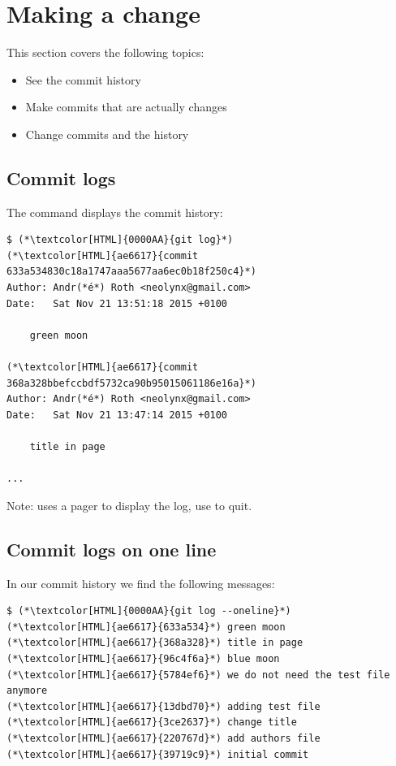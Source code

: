 \section{Making a change}
\begin{frame}[fragile]
  \slidetitle

  This section covers the following topics:
  \begin{itemize}
    \pause
    \item See the commit history
    \pause
    \item Make commits that are actually changes
    \pause
    \item Change commits and the history
  \end{itemize}
\end{frame}

\subsection{Commit logs}
\begin{frame}[fragile]
  \subslidetitle

  The command  displays the commit history:
  \begin{lstlisting}
$ (*\textcolor[HTML]{0000AA}{git log}*)
(*\textcolor[HTML]{ae6617}{commit 633a534830c18a1747aaa5677aa6ec0b18f250c4}*)
Author: Andr(*é*) Roth <neolynx@gmail.com>
Date:   Sat Nov 21 13:51:18 2015 +0100

    green moon

(*\textcolor[HTML]{ae6617}{commit 368a328bbefccbdf5732ca90b95015061186e16a}*)
Author: Andr(*é*) Roth <neolynx@gmail.com>
Date:   Sat Nov 21 13:47:14 2015 +0100

    title in page

...
\end{lstlisting}
Note:  uses a pager to display the log, use  to quit.
\end{frame}

\subsection{Commit logs on one line}
\begin{frame}[fragile]
  \subslidetitle

  In our commit history we find the following messages:
  \begin{lstlisting}
$ (*\textcolor[HTML]{0000AA}{git log --oneline}*)
(*\textcolor[HTML]{ae6617}{633a534}*) green moon
(*\textcolor[HTML]{ae6617}{368a328}*) title in page
(*\textcolor[HTML]{ae6617}{96c4f6a}*) blue moon
(*\textcolor[HTML]{ae6617}{5784ef6}*) we do not need the test file anymore
(*\textcolor[HTML]{ae6617}{13dbd70}*) adding test file
(*\textcolor[HTML]{ae6617}{3ce2637}*) change title
(*\textcolor[HTML]{ae6617}{220767d}*) add authors file
(*\textcolor[HTML]{ae6617}{39719c9}*) initial commit
\end{lstlisting}
\end{frame}

